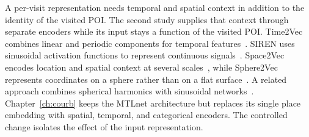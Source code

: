 A per-visit representation needs temporal and spatial context in addition to the
identity of the visited POI. The second study supplies that context through separate
encoders while its input stays a function of the visited POI.
Time2Vec combines linear and periodic components for temporal
features~\cite{kazemi2019time2vec}. SIREN uses sinusoidal activation functions to
represent continuous signals~\cite{sitzmann2020implicit}. Space2Vec encodes location
and spatial context at several scales~\cite{mai2020multiscalerepresentationlearningspatial},
while Sphere2Vec represents coordinates on a sphere rather than on a flat
surface~\cite{mai2023sphere2vecgeneralpurposelocationrepresentation}. A related
approach combines spherical harmonics with sinusoidal
networks~\cite{russwurm2024geographiclocationencodingspherical}.
Chapter~\ref{ch:courb} keeps the MTLnet architecture but replaces its single
place embedding with spatial, temporal, and categorical encoders. The controlled
change isolates the effect of the input representation.

